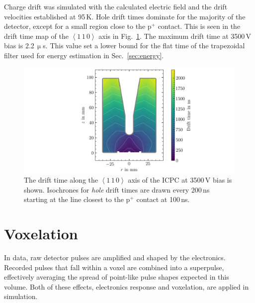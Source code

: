 Charge drift was simulated with the calculated electric field and the drift velocities established at 95\,K. Hole drift times dominate for the majority of the detector, except for a small region close to the p$^+$ contact. This is seen in the drift time map of the $\left<1\,1\,0\right>$ axis in Fig.~\ref{fig:icpc_drifttimes}. The maximum drift time at 3500\,V bias is 2.2\,$\upmu$s. This value set a lower bound for the flat time of the trapezoidal filter used for energy estimation in Sec.~\ref{sec:energy}.
\begin{figure}[htb]
    \centering
    \includegraphics[width=6in]{figs/sim/icpc_drifttimes.png}
    \caption{The drift time along the $\left<1\,1\,0\right>$ axis of the ICPC at 3500\,V bias is shown. Isochrones for \textit{hole} drift times are drawn every 200\,ns starting at the line closest to the p$^+$ contact at 100\,ns.}
    \label{fig:icpc_drifttimes}
\end{figure}

\clearpage 

\section{Voxelation}
In data, raw detector pulses are amplified and shaped by the electronics. Recorded pulses that fall within a voxel are combined into a superpulse, effectively averaging the spread of point-like pulse shapes expected in this volume. Both of these effects, electronics response and voxelation, are applied in simulation. 

